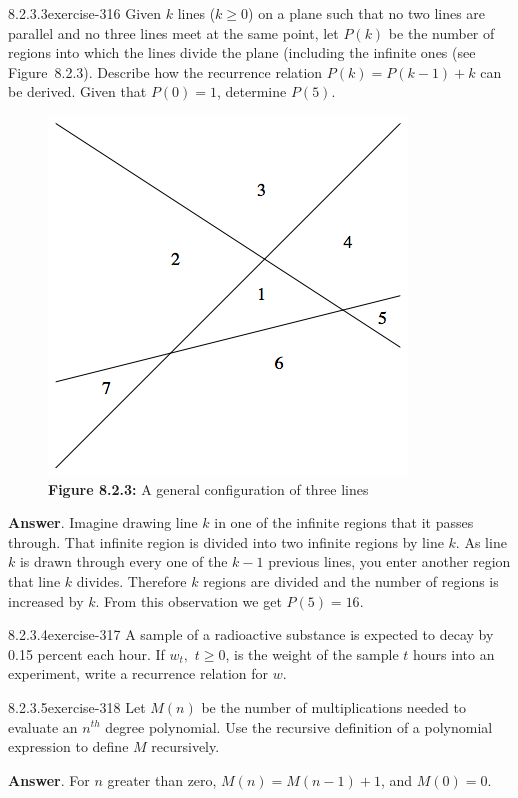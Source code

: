\documentclass[twoside,10pt,]{book}
\numberwithin{equation}{section}
\begin{document}
\begin{divisionsolution}{8.2.3.3}{}{exercise-316}%
\hypertarget{p-2606}{}%
Given \(k\) lines (\(k\geq 0\)) on a plane such that no two lines are parallel and no three lines meet at the same point, let \(P(k)\) be the number of regions into which the lines divide the plane (including the infinite ones (see Figure~8.2.3). Describe how the recurrence relation \(P(k) = P(k - 1) + k\) can be derived. Given that \(P(0) = 1\), determine \(P(5)\).%
\begin{figure}
\centering
\includegraphics[width=0.6\linewidth]{images/exercise-8-2-3.png}
\caption*{\textbf{Figure 8.2.3:} A general configuration of three lines}
\end{figure}
\par\smallskip%
\noindent\textbf{Answer}.\quad%
\hypertarget{p-2607}{}%
Imagine drawing line \(k\) in one of the infinite regions that it passes through. That infinite region is divided into two infinite regions by line \(k\). As line \(k\) is drawn through every one of the \(k-1\) previous lines, you enter another region that line \(k\) divides. Therefore \(k\) regions are divided and the number of regions is increased by \(k\).  From this observation we get \(P(5)=16\).%
\end{divisionsolution}%
\begin{divisionsolution}{8.2.3.4}{}{exercise-317}%
\hypertarget{p-2608}{}%
A sample of a radioactive substance is expected to decay by 0.15 percent each hour. If \(w_t,\) \(t \geq  0\), is the weight of the sample \(t\) hours into an experiment, write a recurrence relation for \(w\).%
\end{divisionsolution}%
\begin{divisionsolution}{8.2.3.5}{}{exercise-318}%
\hypertarget{p-2609}{}%
Let \(M(n)\) be the number of multiplications needed to evaluate an \(n^{th}\) degree polynomial. Use the recursive definition of a polynomial expression to define \(M\) recursively.%
\par\smallskip%
\noindent\textbf{Answer}.\quad%
\hypertarget{p-2610}{}%
For \(n\) greater than zero, \(M(n)=M(n-1)+1\), and \(M(0)=0\).%
\end{divisionsolution}%
\end{document}
